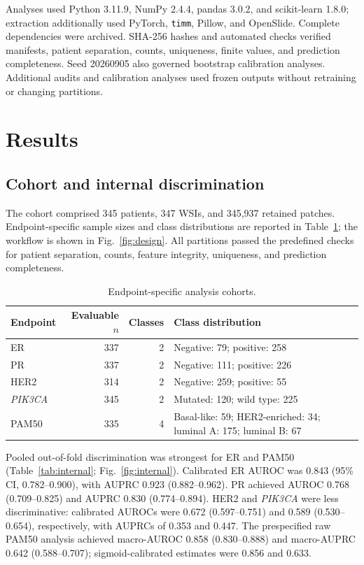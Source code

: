\documentclass[pdflatex]{cas-dc}
\theoremstyle{remark}
\theoremstyle{plain}
\begin{document}
Analyses used Python 3.11.9, NumPy 2.4.4, pandas 3.0.2, and scikit-learn 1.8.0; extraction additionally used PyTorch, \texttt{timm}, Pillow, and OpenSlide. Complete dependencies were archived. SHA-256 hashes and automated checks verified manifests, patient separation, counts, uniqueness, finite values, and prediction completeness. Seed 20260905 also governed bootstrap calibration analyses. Additional audits and calibration analyses used frozen outputs without retraining or changing partitions.



\section{Results}

\subsection{Cohort and internal discrimination}

The cohort comprised 345 patients, 347 WSIs, and 345,937 retained patches. Endpoint-specific sample sizes and class distributions are reported in Table~\ref{tab:cohort}; the workflow is shown in Fig.~\ref{fig:design}. All partitions passed the predefined checks for patient separation, counts, feature integrity, uniqueness, and prediction completeness.



\begin{table}[htbp]
\centering
\caption{Endpoint-specific analysis cohorts.}
\label{tab:cohort}
\begin{tabularx}{\textwidth}{lrrX}
\toprule
Endpoint & Evaluable $n$ & Classes & Class distribution \\
\midrule
ER & 337 & 2 & Negative: 79; positive: 258 \\
PR & 337 & 2 & Negative: 111; positive: 226 \\
HER2 & 314 & 2 & Negative: 259; positive: 55 \\
\textit{PIK3CA} & 345 & 2 & Mutated: 120; wild type: 225 \\
PAM50 & 335 & 4 & Basal-like: 59; HER2-enriched: 34; luminal A: 175; luminal B: 67 \\
\bottomrule
\end{tabularx}
\end{table}

Pooled out-of-fold discrimination was strongest for ER and PAM50 (Table~\ref{tab:internal}; Fig.~\ref{fig:internal}). Calibrated ER AUROC was 0.843 (95\% CI, 0.782--0.900), with AUPRC 0.923 (0.882--0.962). PR achieved AUROC 0.768 (0.709--0.825) and AUPRC 0.830 (0.774--0.894). HER2 and \textit{PIK3CA} were less discriminative: calibrated AUROCs were 0.672 (0.597--0.751) and 0.589 (0.530--0.654), respectively, with AUPRCs of 0.353 and 0.447. The prespecified raw PAM50 analysis achieved macro-AUROC 0.858 (0.830--0.888) and macro-AUPRC 0.642 (0.588--0.707); sigmoid-calibrated estimates were 0.856 and 0.633.
\end{document}
